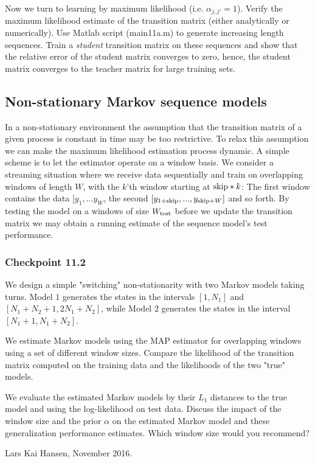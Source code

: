 \documentclass[A4,12pt]{article}    %
\begin{document}
Now we turn to learning by maximum likelihood (i.e. $\alpha_{j,j'}=1$). Verify the maximum likelihood estimate of the transition matrix (either analytically or numerically).
Use Matlab script ({\sf main11a.m}) to generate increasing length sequences.
Train a {\it student} transition matrix on these sequences and show that the relative error of the student matrix
converges to zero, hence, the student matrix converges to the teacher matrix for large training sets.

\subsection*{Non-stationary Markov sequence models}
In a non-stationary environment the assumption that the transition matrix of a given process is constant in time may be too restrictive. To relax this assumption we can make the maximum likelihood estimation process dynamic. A simple scheme is to let the estimator operate on a window basis. We consider a streaming situation where we receive data sequentially and train on overlapping windows of length $W$, with the $k$'th window starting at ${\rm skip}*k$: The first window contains the data $[y_{1},...y_{W}$, the second $[y_{1+{\rm skip}},...,y_{{\rm skip} + W}]$ and so forth. By testing the model on a windows of size $W_{\rm test}$ before we update the transition matrix we may obtain a running estimate of the sequence model's test performance.


\subsubsection*{Checkpoint 11.2}
We design a simple "switching" non-stationarity with two Markov models taking turns.
Model $1$ generates the states in the intervals $[1,N_1]$ and $[N_1 + N_2 + 1, 2N_1 + N_2]$, while
Model $2$ generates the states in the interval $[N_1 +1,N_1 + N_2]$.

We estimate Markov models using the MAP estimator for overlapping windows using a set of different window sizes.
Compare the likelihood of the transition matrix computed on the training data and the likelihoods of the two "true" models.

We evaluate the estimated Markov models by their $L_1$ distances to the true model and using the log-likelihood on test data.
Discuss the impact of the window size and the prior $\alpha$ on the estimated Markov model and these generalization performance estimates.
Which window size would you recommend?


\vspace*{2cm}

Lars Kai Hansen, November 2016.
\end{document}
